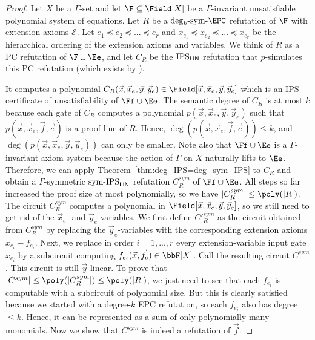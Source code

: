 \documentclass[a4paper,UKenglish,cleveref, autoref, thm-restate]{lipics-v2021}
\newcommand{\IPSlin}{\text{\upshape IPS}_{\mathsf{LIN}}}
\newcommand{\symIPSlin}{\text{ \upshape sym-IPS}_{\mathsf{LIN}}}
\begin{document}
\begin{proof}
	Let $X$ be a $\Gamma$-set and let $\F \subseteq \Field[X]$
	be a $\Gamma$-invariant unsatisfiable polynomial system of equations.
	Let $R$ be a $\mathrm{deg}_k \text{-}\mathrm{sym}\text{-}\EPC$ refutation of $\F$ with 	extension axioms $\mathcal{E}$. 
	Let $e_1 \preceq e_2 \preceq ...\preceq e_r$ 
	and $x_{e_1}\preceq x_{e_2} \preceq ...\preceq x_{e_r}$ be
	the hierarchical ordering of the extension axioms and variables.
	We think of $R$ as a PC refutation of $\F \cup \Ee$, and let $C_R$ be the $\IPSlin$ refutation that $p$-simulates this PC refutation (which exists by \cite[Proposition 3.4]{IPS}).
	
	It computes a polynomial 
	$C_R(\vec x, \vec x_e, \vec y, \vec y_e)\in \Field[\vec x, \vec x_e,\vec y, \vec y_e ]$ which is an IPS certificate of unsatisfiability of $\Ff \cup \Ee$. The semantic degree of $C_R$ is at most $k$ because each gate of $C_R$ computes a polynomial $p(\vec x, \vec x_e, \vec y, \vec y_e)$ such that $p(\vec x, \vec x_e, \vec f, \vec e)$ is a proof line of $R$. Hence, $\deg(p(\vec x, \vec x_e, \vec f, \vec e)) \leq k$, and $\deg(p(\vec x, \vec x_e, \vec y, \vec y_e))$ can only be smaller.
	Note also that $\Ff \cup \Ee$ is a $\Gamma$-invariant axiom system because the action of $\Gamma$ on $X$ naturally lifts to $\Ee$.
	Therefore, we can apply Theorem~\ref{thm:deg_IPS=deg_sym_IPS} to $C_R$ and obtain a $\Gamma$-symmetric$\symIPSlin$ refutation $C^{sym}_R$ of $\Ff \cup \Ee$. 
	All steps so far increased the proof size at most polynomially, so we have $|C^{sym}_R| \leq \poly(|R|)$.\\
	The circuit $C^{sym}_R$ computes a polynomial in $\Field[\vec x, \vec x_e,\vec y, \vec y_e]$, so we still need to get rid of the $\vec x_e$- and $\vec y_e$-variables. We first define $C'^{sym}_R$ as the circuit obtained from $C^{sym}_R$ by replacing the $\vec y_e$-variables with the corresponding extension axioms $x_{e_i} - f_{e_i}$. 
	Next, we replace in order $i=1, ..., r$ every extension-variable input gate $x_{e_i}$ by a subcircuit computing $f_{e_i}(\vec x, \vec f_e) \in \bbF[X]$. Call the resulting circuit $C^{sym}$. This circuit is still $\vec y$-linear. To prove that $|C^{sym}| \leq \poly(|C^{sym}_R|) \leq \poly(|R|)$, we just need to see that each $f_{e_i}$ is computable with a subcircuit of polynomial size. But this is clearly satisfied because we started with a degree-$k$ EPC refutation, so each $f_{e_i}$ also has degree $\leq k$. Hence, it can be represented as a sum of only polynomially many monomials. 
	Now we show that $C^{sym}$ is indeed a refutation of $\vec f$.

\end{proof}
\end{document}
